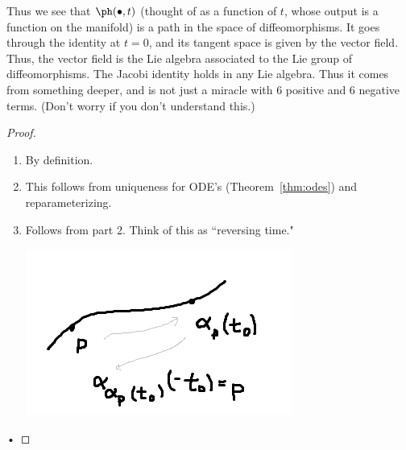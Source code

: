 \vskip0.15in

Thus we see that $\ph(\bullet,t)$ (thought of as a function of $t$, whose output is a function on the manifold) is a path in the space of diffeomorphisms. It goes through the identity at $t=0$, and its tangent space is given by the vector field. Thus, the vector field is the Lie algebra associated to the Lie group of diffeomorphisms. The Jacobi identity holds in any Lie algebra. Thus it comes from something deeper, and is not just a miracle with 6 positive and 6 negative terms. (Don't worry if you don't understand this.)
\begin{proof}
\begin{enumerate}
\item By definition.
\item This follows from uniqueness for ODE's (Theorem~\ref{thm:odes}) and reparameterizing. 
\item
Follows from part 2. Think of this as ``reversing time." %
\begin{center}
\includegraphics{2-1}
\end{center}
\end{enumerate}•
\end{proof}


